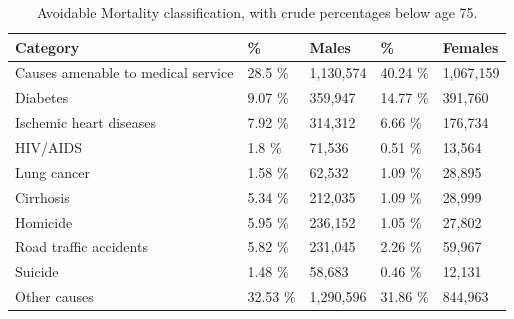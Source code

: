 \documentclass[11.5pt]{article}
\begin{document}
\begin{spacing}{1.5}
\begin{table}[ht]
\centering
\caption{Avoidable Mortality classification, 
             with crude percentages below age 75.} 
\label{tab:causes}
\begin{tabular}{lllll}
  \hline
Category &\% & Males &  \% & Females \\ 
  \hline
Causes amenable to medical service &                             28.5 \% &                          1,130,574 &                            40.24 \% &                          1,067,159 \\ 
                            Diabetes &                             9.07 \% &                            359,947 &                            14.77 \% &                            391,760 \\ 
             Ischemic heart diseases &                             7.92 \% &                            314,312 &                             6.66 \% &                            176,734 \\ 
                            HIV/AIDS &                              1.8 \% &                             71,536 &                             0.51 \% &                             13,564 \\ 
                         Lung cancer &                             1.58 \% &                             62,532 &                             1.09 \% &                             28,895 \\ 
                           Cirrhosis &                             5.34 \% &                            212,035 &                             1.09 \% &                             28,999 \\ 
                            Homicide &                             5.95 \% &                            236,152 &                             1.05 \% &                             27,802 \\ 
              Road traffic accidents &                             5.82 \% &                            231,045 &                             2.26 \% &                             59,967 \\ 
                             Suicide &                             1.48 \% &                             58,683 &                             0.46 \% &                             12,131 \\ 
                        Other causes &                            32.53 \% &                          1,290,596 &                            31.86 \% &                            844,963 \\ 
   \hline
\end{tabular}
\end{table}


\end{spacing}
\end{document}
